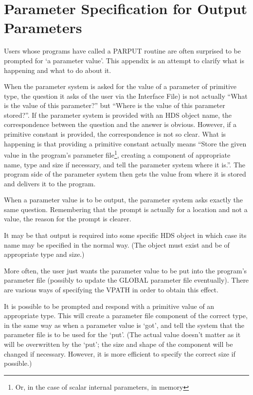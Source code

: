 \documentclass[twoside,11pt]{article}
\newcommand{\xlabel}[1]{}
\renewcommand{\_}{\texttt{\symbol{95}}}
\begin{document}
\newpage

\section{Parameter Specification for Output Parameters
\xlabel{parameter_specification_for_output_parameters}\label{output}}

Users whose programs have called a PAR\_PUT routine are often surprised
to be prompted for `a parameter value'.
This appendix is an attempt to clarify what is happening and what to do about
it.

When the parameter system is asked for the value of a parameter of primitive
type, the question it asks of the user via the Interface File) is not 
actually ``What is the value of this parameter?'' but ``Where is the value of 
this parameter stored?''. 
If the parameter system is provided with an HDS object name, the 
correspondence between the question and the answer is obvious.
However, if a primitive constant is provided, the correspondence is not so
clear.
What is happening is that providing a primitive constant actually
means ``Store the given value in the program's parameter file\footnote{Or, in 
the case of scalar internal parameters, in memory},
creating a component of appropriate name, type and size if necessary, and tell 
the parameter system where it is.''.
The program side of the parameter system then gets the value from where it
is stored and delivers it to the program.

When a parameter value is to be output, the parameter system asks exactly the
same question. 
Remembering that the prompt is actually for a location and not a value,
the reason for the prompt is clearer.

It may be that output is required into some specific HDS object in which case
its name may be specified in the normal way. 
(The object must exist and be of appropriate type and size.)

More often, the user just wants the parameter value to be put into the
program's parameter file (possibly to update the GLOBAL parameter file 
eventually).
There are various ways of specifying the VPATH in order to obtain this effect.

It is possible to be prompted and respond with a primitive value
of an appropriate type.
This will create a parameter file component of the correct type, in
the same way as when a parameter value is `got', and tell the system that
the parameter file is to be used for the `put'.
(The actual value doesn't matter as it will be overwritten by the `put';
the size and shape of the component will be changed if necessary. However,
it is more efficient to specify the correct size if possible.)
\end{document}
